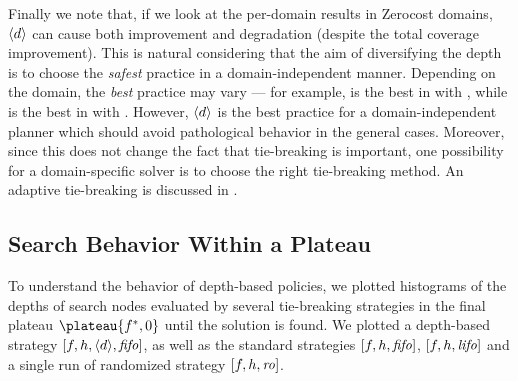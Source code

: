 Finally we note that, if we look at the per-domain results in Zerocost domains,
${\left<d\right>}$ can cause both improvement and degradation (despite the total coverage improvement).
This is natural considering that the aim of diversifying the depth is to choose the \emph{safest} practice in a domain-independent manner.
Depending on the domain, the \emph{best} practice may vary --- for example,
 \fifo is the best in  with \lmcut, while
 \lifo is the best in  with \lmcut.
 However, ${\left<d\right>}$ is the best practice for a domain-independent planner which should avoid pathological behavior in the general cases.
 Moreover, since this does not change the fact that tie-breaking is important,
 one possibility for a domain-specific solver is to choose the right tie-breaking method.
 An adaptive tie-breaking is discussed in .




\clearpage

\subsection{Search Behavior Within a Plateau}

To understand the behavior of depth-based policies, we plotted 
histograms of the depths of search nodes evaluated by several tie-breaking
strategies in the final plateau $\plateau{f^*,0}$ until the solution is
found.  We plotted a depth-based strategy
$[f,h,{\left<d\right>},{\text{\textit{fifo}}}]$, as well as the standard strategies $[f,h,{\text{\textit{fifo}}}]$,
$[f,h,{\text{\textit{lifo}}}]$ and a single run of randomized strategy $[f,h,{\text{\textit{ro}}}]$.

